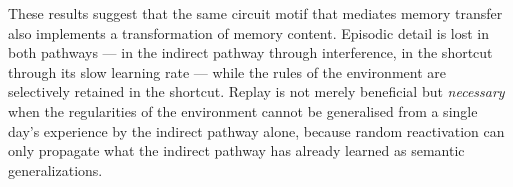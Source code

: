 
These results suggest that the same circuit motif that mediates memory transfer also implements a transformation of memory content. Episodic detail is lost in both pathways --- in the indirect pathway through interference, in the shortcut through its slow learning rate --- while the rules of the environment are selectively retained in the shortcut. Replay is not merely beneficial but \emph{necessary} when the regularities of the environment cannot be generalised from a single day's experience by the indirect pathway alone, because random reactivation can only propagate what the indirect pathway has already learned as semantic generalizations.
